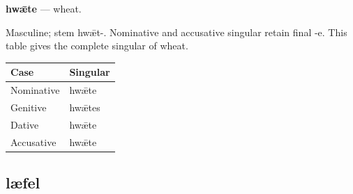 \par\begin{minipage}{\linewidth}\raggedright
\textbf{hwǣte} — wheat.

Masculine; stem hwǣt-. Nominative and accusative singular retain final -e. This table gives the complete singular of wheat.

\par\begingroup
\fontsize{10.5}{13.2}\selectfont
\setlength{\LTleft}{0pt}\setlength{\LTright}{\fill}
\noindent
\begin{tabular}{@{}>{\raggedright\arraybackslash}p{60.59mm}>{\raggedright\arraybackslash}p{60.59mm}@{}}
\toprule
\textbf{Case} & \textbf{Singular} \\
\midrule
Nominative & hwǣte \\
Genitive & hwǣtes \\
Dative & hwǣte \\
Accusative & hwǣte \\
\bottomrule
\end{tabular}
\par\endgroup

\end{minipage}\par
{}
\subsection*{læfel}


